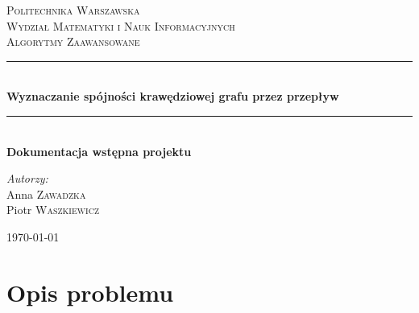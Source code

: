 \documentclass{article}
\begin{document}
	
\begin{titlepage}

\newcommand{\HRule}{\rule{\linewidth}{0.5mm}}

\center


\textsc{\LARGE Politechnika Warszawska}\\[5mm]
\textsc{\LARGE Wydział Matematyki i Nauk Informacyjnych}\\[4cm]
 

\textsc{\Huge Algorytmy Zaawansowane}\\[0.5cm]


\HRule \\[0.4cm]
{ \LARGE \bfseries Wyznaczanie spójności krawędziowej grafu przez przepływ}\\[0.2cm]
 

\HRule \\[0.4cm]
{  \bfseries Dokumentacja wstępna projektu}\\[2.5cm]
 

\begin{flushright}
\Large \emph{Autorzy:}\\[0.5cm]
Anna \textsc{Zawadzka}\\
Piotr \textsc{Waszkiewicz}\\[3.5cm]
\end{flushright}

\vfill
{\large \today}\\[3cm]

\end{titlepage}
	
\newpage

\section{Opis problemu}
\end{document}
